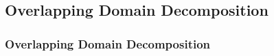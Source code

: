 \documentclass[aspectratio=169,11pt]{beamer}
\theoremstyle{definition}
\begin{document}
\subsection{Overlapping Domain Decomposition}
\begin{frame}
  \frametitle<presentation>{Overlapping Domain Decomposition}

  \begin{columns}
    \begin{column}{0.6\linewidth}


\end{column}
\end{columns}
\end{frame}
\end{document}

